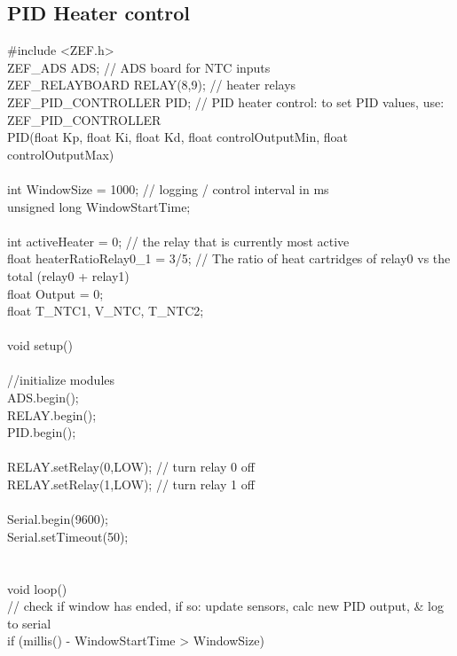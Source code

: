 \begin{appendices}
\subsection{PID Heater control}
{\selectfont
\#include <ZEF.h> \\
ZEF\_ADS ADS;             	    // ADS board for NTC inputs \\
ZEF\_RELAYBOARD  RELAY(8,9);    	    // heater relays \\
ZEF\_PID\_CONTROLLER PID;             // PID heater control: to set PID values, use: ZEF\_PID\_CONTROLLER \\ PID(float Kp, float Ki, float Kd, float controlOutputMin, float controlOutputMax) \\
\\
int WindowSize = 1000;				// logging / control interval in ms \\
unsigned long WindowStartTime; \\
\\
int activeHeater = 0;				// the relay that is currently most active \\
float heaterRatioRelay0\_1 = 3/5;	// The ratio of heat cartridges of relay0 vs the total (relay0 + relay1) \\
float Output = 0; \\
float T\_NTC1, V\_NTC, T\_NTC2; \\
\\
void setup() { \\
\\
    //initialize modules \\
    ADS.begin(); \\
    RELAY.begin(); \\
    PID.begin(); \\
\\
    RELAY.setRelay(0,LOW); // turn relay 0 off \\
    RELAY.setRelay(1,LOW); // turn relay 1 off \\
\\
    Serial.begin(9600); \\
    Serial.setTimeout(50); \\
} \\
\\
void loop() { \\
    // check if window has ended, if so: update sensors, calc new PID output, \& log to serial \\
    if (millis() - WindowStartTime > WindowSize) \\
    { \\
}}}
\end{appendices}
